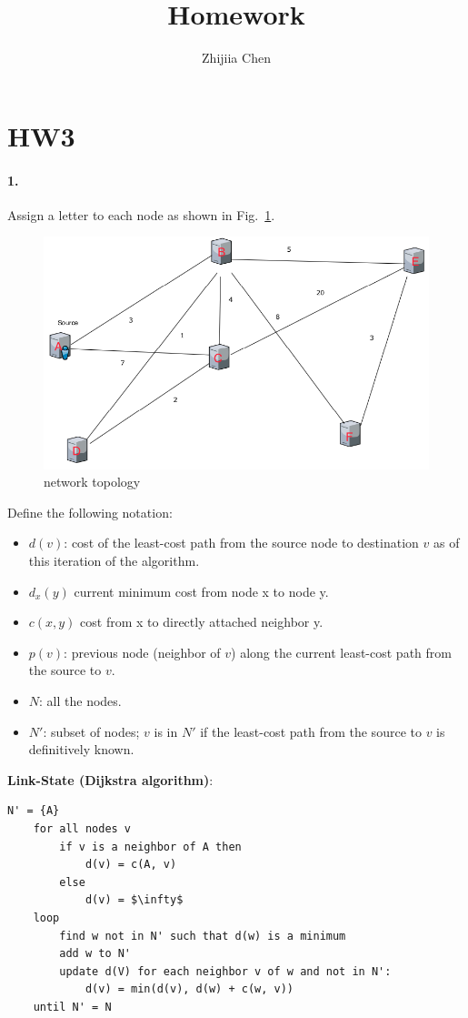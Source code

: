 \documentclass{article}
\title{Homework}
\author{Zhijiia Chen}
\begin{document}
\section{HW3}

\paragraph{1.} Assign a letter to each node as shown in Fig.~\ref{fig:topo}.
\begin{figure}
    \centering
    \includegraphics[width=\linewidth]{fig/topo.png}
    \caption{network topology
    } \label{fig:topo}
\end{figure}
Define the following notation:

\begin{itemize}
    \item $d(v)$: cost of the least-cost path from the source node to destination $v$ as of this iteration of the algorithm.
    \item $d_x(y)$ current minimum cost from node x to node y.
    \item $c(x, y)$ cost from x to directly attached neighbor y.
    \item $p(v)$: previous node (neighbor of $v$) along the current least-cost path from the source to $v$.
    \item $N$: all the nodes.
    \item $N'$: subset of nodes; $v$ is in $N'$ if the least-cost path from the source to $v$ is definitively known.
\end{itemize}

\textbf{Link-State (Dijkstra algorithm)}: 

\begin{lstlisting}[mathescape=true]
    N' = {A}
    for all nodes v
        if v is a neighbor of A then
            d(v) = c(A, v)
        else 
            d(v) = $\infty$
    loop
        find w not in N' such that d(w) is a minimum
        add w to N'
        update d(V) for each neighbor v of w and not in N':
            d(v) = min(d(v), d(w) + c(w, v))
    until N' = N
\end{lstlisting}
\end{document}
